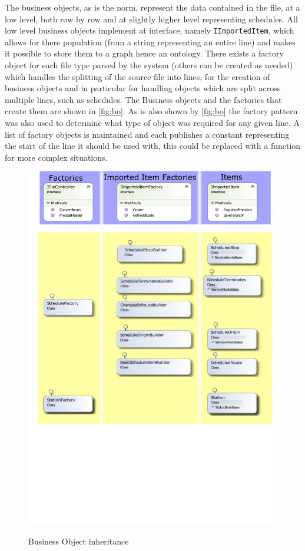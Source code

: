 The business objects, as is the norm, represent the data contained in the file, at a low level, both row by row and at slightly higher level representing schedules. All low level business objects implement at interface, namely \lstinline{IImportedItem}, which allows for there population (from a string representing an entire line) and makes it possible to store them to a graph hence an ontology. There exists a factory object for each file type parsed by the system (others can be created as needed) which handles the splitting of the source file into lines, for the creation of business objects and in particular for handling objects which are split across multiple lines, such as schedules. The Business objects and the factories that create them are shown in \autoref{fig:bo}. As is also shown by \autoref{fig:bo} the factory pattern was also used to determine what type of object was required for any given line. A list of factory objects is maintained and each publishes a constant representing the start of the line it should be used with, this could be replaced with a function for more complex situations.

\begin{figure}[!h]
\myfloatalign
{\includegraphics[width=\linewidth]{gfx/BussinessObjectsCat}} 
\caption{Business Object inheritance}
\label{fig:bo}
\end{figure}

